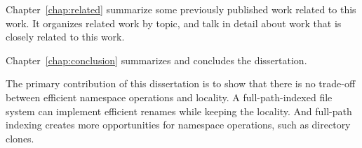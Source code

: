 Chapter~\ref{chap:related} summarize some previously published work related to
this work.
It organizes related work by topic, and talk in detail about work that is closely
related to this work.

Chapter~\ref{chap:conclusion} summarizes and concludes the dissertation.

The primary contribution of this dissertation is to show that there is no
trade-off between efficient namespace operations and locality.
A full-path-indexed file system can implement efficient renames while keeping
the locality.
And full-path indexing creates more opportunities for namespace operations,
such as directory clones.

